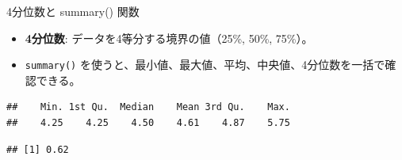 \documentclass[
  ignorenonframetext,
]{beamer}
\newenvironment{Shaded}{\begin{snugshade}}{\end{snugshade}}
\newcommand{\CommentTok}[1]{\textcolor[rgb]{0.56,0.35,0.01}{\textit{#1}}}
\newcommand{\FunctionTok}[1]{\textcolor[rgb]{0.00,0.00,0.00}{#1}}
\newcommand{\NormalTok}[1]{#1}
\newcommand{\SpecialCharTok}[1]{\textcolor[rgb]{0.00,0.00,0.00}{#1}}
\providecommand{\tightlist}{%
  \setlength{\itemsep}{0pt}\setlength{\parskip}{0pt}}
\begin{document}
\begin{frame}[fragile]{4分位数と summary() 関数}
\protect\hypertarget{ux5206ux4f4dux6570ux3068-summary-ux95a2ux6570}{}
\begin{itemize}
\tightlist
\item
  \textbf{4分位数}: データを4等分する境界の値（25\%, 50\%, 75\%）。
\item
  \texttt{summary()}
  を使うと、最小値、最大値、平均、中央値、4分位数を一括で確認できる。
\end{itemize}

\scriptsize

\begin{Shaded}
\end{Shaded}

\begin{verbatim}
##    Min. 1st Qu.  Median    Mean 3rd Qu.    Max. 
##    4.25    4.25    4.50    4.61    4.87    5.75
\end{verbatim}

\begin{Shaded}
\end{Shaded}

\begin{verbatim}
## [1] 0.62
\end{verbatim}

\normalsize
\end{frame}
\end{document}
